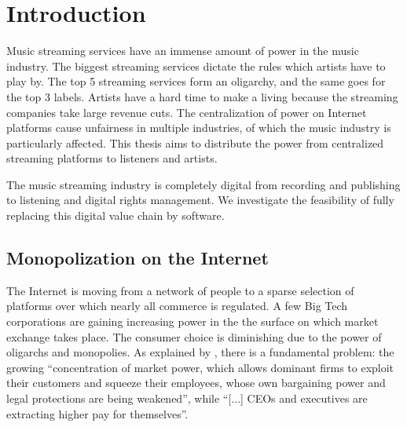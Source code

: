 \chapter{Introduction}
\label{introduction}
Music streaming services have an immense amount of power in the music industry. The biggest streaming services dictate the rules which artists have to play by. The top 5 streaming services form an oligarchy, and the same goes for the top 3 labels. Artists have a hard time to make a living because the streaming companies take large revenue cuts. The centralization of power on Internet platforms cause unfairness in multiple industries, of which the music industry is particularly affected. This thesis aims to distribute the power from centralized streaming platforms to listeners and artists.

The music streaming industry is completely digital\; from recording and publishing to listening and digital rights management. We investigate the feasibility of fully replacing this digital value chain by software. 


\section{Monopolization on the Internet}
The Internet is moving from a network of people to a sparse selection of platforms over which nearly all commerce is regulated. A few Big Tech corporations are gaining increasing power in the the surface on which market exchange takes place. The consumer choice is diminishing due to the power of oligarchs and monopolies. As explained by \citep{stiglitz2019market}, there is a fundamental problem: the growing ``concentration of market power, which allows dominant firms to exploit their customers and squeeze their employees, whose own bargaining power and legal protections are being weakened'', while ``[...] CEOs and executives are extracting higher pay for themselves''.

